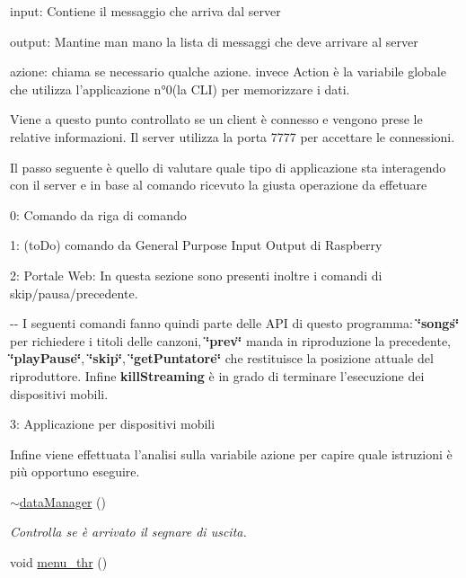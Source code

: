 \begin{DoxyItemize}
\item input\-: \-Contiene il messaggio che arriva dal server \par

\item output\-: \-Mantine man mano la lista di messaggi che deve arrivare al server \par

\item azione\-: chiama se necessario qualche azione. invece \-Action è la variabile globale che utilizza l'applicazione n°0(la C\-L\-I) per memorizzare i dati. \par
 \-Viene a questo punto controllato se un client è connesso e vengono prese le relative informazioni. \-Il server utilizza la porta 7777 per accettare le connessioni. \par
 \-Il passo seguente è quello di valutare quale tipo di applicazione sta interagendo con il server e in base al comando ricevuto la giusta operazione da effetuare \par

\item 0\-: \-Comando da riga di comando \par

\item 1\-: (to\-Do) comando da \-General \-Purpose \-Input \-Output di \-Raspberry \par

\item 2\-: \-Portale \-Web\-: \-In questa sezione sono presenti inoltre i comandi di skip/pausa/precedente. \par
 -\/-\/ \-I seguenti comandi fanno quindi parte delle \-A\-P\-I di questo programma\-: {\bfseries \char`\"{}songs\char`\"{}} per richiedere i titoli delle canzoni, {\bfseries \char`\"{}prev\char`\"{}} manda in riproduzione la precedente, {\bfseries \char`\"{}play\-Pause\char`\"{}}, {\bfseries \char`\"{}skip\char`\"{}}, {\bfseries \char`\"{}get\-Puntatore\char`\"{}} che restituisce la posizione attuale del riproduttore. \-Infine {\bfseries kill\-Streaming} è in grado di terminare l'esecuzione dei dispositivi mobili. \par

\item 3\-: \-Applicazione per dispositivi mobili \par
 \-Infine viene effettuata l'analisi sulla variabile azione per capire quale istruzioni è più opportuno eseguire. 
\end{DoxyItemize}\begin{DoxyCompactItemize}
\item 
\hyperlink{classdataManager_ac9e28e6a50c6ad489ca7376b89cc20cb}{$\sim$data\-Manager} ()
\begin{DoxyCompactList}\small\item\em \-Controlla se è arrivato il segnare di uscita. \end{DoxyCompactList}\item 
\hypertarget{classdataManager_a7ba580547b0d0dbe516b8e694e9f51b2}{void \hyperlink{classdataManager_a7ba580547b0d0dbe516b8e694e9f51b2}{menu\-\_\-thr} ()}\label{classdataManager_a7ba580547b0d0dbe516b8e694e9f51b2}


\end{DoxyCompactItemize}

